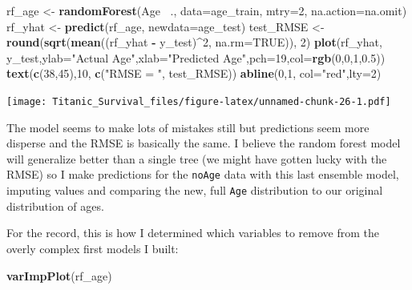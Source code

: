 \documentclass[]{article}
\newenvironment{Shaded}{\begin{snugshade}}{\end{snugshade}}
\newcommand{\KeywordTok}[1]{\textcolor[rgb]{0.13,0.29,0.53}{\textbf{#1}}}
\newcommand{\DataTypeTok}[1]{\textcolor[rgb]{0.13,0.29,0.53}{#1}}
\newcommand{\DecValTok}[1]{\textcolor[rgb]{0.00,0.00,0.81}{#1}}
\newcommand{\FloatTok}[1]{\textcolor[rgb]{0.00,0.00,0.81}{#1}}
\newcommand{\StringTok}[1]{\textcolor[rgb]{0.31,0.60,0.02}{#1}}
\newcommand{\OtherTok}[1]{\textcolor[rgb]{0.56,0.35,0.01}{#1}}
\newcommand{\OperatorTok}[1]{\textcolor[rgb]{0.81,0.36,0.00}{\textbf{#1}}}
\newcommand{\NormalTok}[1]{#1}
\begin{document}
\begin{Shaded}
\begin{Highlighting}[]
\NormalTok{rf_age <-}\StringTok{ }\KeywordTok{randomForest}\NormalTok{(Age }\OperatorTok{~}\NormalTok{., }\DataTypeTok{data=}\NormalTok{age_train, }\DataTypeTok{mtry=}\DecValTok{2}\NormalTok{, }\DataTypeTok{na.action=}\NormalTok{na.omit)}
\NormalTok{rf_yhat <-}\StringTok{ }\KeywordTok{predict}\NormalTok{(rf_age, }\DataTypeTok{newdata=}\NormalTok{age_test)}
\NormalTok{test_RMSE <-}\StringTok{ }\KeywordTok{round}\NormalTok{(}\KeywordTok{sqrt}\NormalTok{(}\KeywordTok{mean}\NormalTok{((rf_yhat }\OperatorTok{-}\StringTok{ }\NormalTok{y_test)}\OperatorTok{^}\DecValTok{2}\NormalTok{, }\DataTypeTok{na.rm=}\OtherTok{TRUE}\NormalTok{)), }\DecValTok{2}\NormalTok{)}
\KeywordTok{plot}\NormalTok{(rf_yhat, y_test,}\DataTypeTok{ylab=}\StringTok{"Actual Age"}\NormalTok{,}\DataTypeTok{xlab=}\StringTok{"Predicted Age"}\NormalTok{,}\DataTypeTok{pch=}\DecValTok{19}\NormalTok{,}\DataTypeTok{col=}\KeywordTok{rgb}\NormalTok{(}\DecValTok{0}\NormalTok{,}\DecValTok{0}\NormalTok{,}\DecValTok{1}\NormalTok{,}\FloatTok{0.5}\NormalTok{))}
\KeywordTok{text}\NormalTok{(}\KeywordTok{c}\NormalTok{(}\DecValTok{38}\NormalTok{,}\DecValTok{45}\NormalTok{),}\DecValTok{10}\NormalTok{, }\KeywordTok{c}\NormalTok{(}\StringTok{"RMSE = "}\NormalTok{, test_RMSE))}
\KeywordTok{abline}\NormalTok{(}\DecValTok{0}\NormalTok{,}\DecValTok{1}\NormalTok{, }\DataTypeTok{col=}\StringTok{"red"}\NormalTok{,}\DataTypeTok{lty=}\DecValTok{2}\NormalTok{)}
\end{Highlighting}
\end{Shaded}

\texttt{[image: Titanic\_Survival\_files/figure-latex/unnamed-chunk-26-1.pdf]}

The model seems to make lots of mistakes still but predictions seem more
disperse and the RMSE is basically the same. I believe the random forest
model will generalize better than a single tree (we might have gotten
lucky with the RMSE) so I make predictions for the \texttt{noAge} data
with this last ensemble model, imputing values and comparing the new,
full \texttt{Age} distribution to our original distribution of ages.

For the record, this is how I determined which variables to remove from
the overly complex first models I built:

\begin{Shaded}
\begin{Highlighting}[]
\KeywordTok{varImpPlot}\NormalTok{(rf_age)}
\end{Highlighting}
\end{Shaded}
\end{document}
